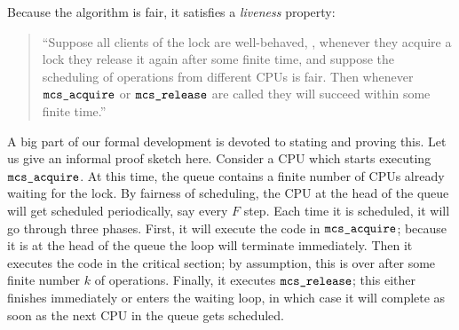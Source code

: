 Because the algorithm is fair, it satisfies a \emph{liveness}
property:\begin{quote}
``Suppose all clients of the lock are well-behaved, \ie, whenever they acquire a lock they release it again after some finite time, and suppose the scheduling of operations from different CPUs is fair. Then  whenever ${\mathrm{\texttt{mcs\_acquire}}}$ or ${\mathrm{\texttt{mcs\_release}}}$ are called they will succeed within some finite time.''
\end{quote}
A big part of our formal development is devoted to stating and proving
this.
Let us give an informal proof sketch here. 
Consider a CPU which starts executing ${\mathrm{\texttt{mcs\_acquire}}}$.
At this time, the queue contains a finite number of CPUs already waiting for the lock.
By fairness of scheduling, the CPU at the head of the queue will get scheduled periodically, say every $F$ step. Each time it is scheduled, it will go through three phases. 
First, it will execute the code in ${\mathrm{\texttt{mcs\_acquire}}}$; because it is at the head of the queue the loop will terminate immediately. 
Then it executes the code in the critical section; by assumption, this is over after some finite number $k$ of operations. 
Finally, it executes ${\mathrm{\texttt{mcs\_release}}}$; this either finishes immediately or enters the waiting loop, in which case it will complete as soon as the next CPU in the queue gets scheduled. 





